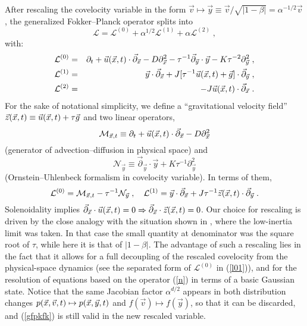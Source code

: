After rescaling the covelocity variable in the form $\vec{v}\mapsto\vec{y}\equiv\vec{v}/\sqrt{|1-\beta|}=\alpha^{-1/2}\vec{v}$, the generalized
Fokker--Planck operator splits into
\begin{equation} \label{l012}
 \mathcal{L}=\mathcal{L}^{(0)}+\alpha^{1/2}\mathcal{L}^{(1)}+\alpha\mathcal{L}^{(2)}\;,
\end{equation}
with:
\begin{eqnarray*}
 \mathcal{L}^{(0)}&=&\partial_t+\vec{u}(\vec{x},t)\cdot\vec{\partial}_{\vec{x}}-D\partial^2_{\vec{x}}-\tau^{-1}\vec{\partial}_{\vec{y}}\cdot\vec{y}-K\tau^{-2}\partial^2_{\vec{y}}\;,\\
 \mathcal{L}^{(1)}&=&\vec{y}\cdot\vec{\partial}_{\vec{x}}+J[\tau^{-1}\vec{u}(\vec{x},t)+\vec{g}]\cdot\vec{\partial}_{\vec{y}}\;,\\
 \mathcal{L}^{(2)}&=&-J\vec{u}(\vec{x},t)\cdot\vec{\partial}_{\vec{x}}\;.
\end{eqnarray*}
For the sake of notational simplicity, we define a ``gravitational velocity field'' $\vec{z}(\vec{x},t)\equiv\vec{u}(\vec{x},t)+\tau\vec{g}$ and two linear operators,
\begin{equation} \label{m}
 \mathcal{M}_{\vec{x},t}\equiv\partial_t+\vec{u}(\vec{x},t)\cdot\vec{\partial}_{\vec{x}}-D\partial^2_{\vec{x}}
\end{equation}
(generator of advection--diffusion in physical space) and
\begin{equation} \label{n}
 \mathcal{N}_{\vec{y}}\equiv\vec{\partial}_{\vec{y}}\cdot\vec{y}+K\tau^{-1}\partial^2_{\vec{y}}
\end{equation}
(Ornstein--Uhlenbeck formalism in covelocity variable). In terms of them,
\begin{equation} \label{l01}
 \mathcal{L}^{(0)}=\mathcal{M}_{\vec{x},t}-\tau^{-1}\mathcal{N}_{\vec{y}}\;,\quad\mathcal{L}^{(1)}=\vec{y}\cdot\vec{\partial}_{\vec{x}}+J\tau^{-1}\vec{z}(\vec{x},t)\cdot\vec{\partial}_{\vec{y}}\;.
\end{equation}
Solenoidality implies $\vec{\partial}_{\vec{x}}\cdot\vec{u}(\vec{x},t)=0\Rightarrow\vec{\partial}_{\vec{x}}\cdot\vec{z}(\vec{x},t)=0$.
Our choice for rescaling is driven by the close analogy with the situation shown in \cite{MAM11,MACMO2009,MAMM2011,MA08,MAMM12},
where the low-inertia limit was taken.
In that case the small quantity at denominator was the square root of $\tau$, while here it is that of $|1-\beta|$.
The advantage of such a rescaling lies in the fact that it allows for a full decoupling of the rescaled covelocity from the
physical-space dynamics (see the separated form of $\mathcal{L}^{(0)}$ in (\ref{l01})),
and for the resolution of equations based on the operator (\ref{n}) in terms of a basic Gaussian state.
Notice that the same Jacobian factor $\alpha^{d/2}$ appears in both distribution changes $p(\vec{x},\vec{v},t)\mapsto p(\vec{x},\vec{y},t)$ and $f(\vec{v})\mapsto f(\vec{y})$,
so that it can be discarded, and (\ref{gfpkfk}) is still valid in the new rescaled variable.
 
